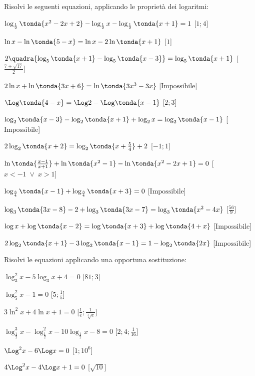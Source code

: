\begin{esercizio}\label{ese:}
 Risolvi le seguenti equazioni, applicando le proprietà dei logaritmi:
 \begin{enumeratea}
   \item \(\log_{\frac{1}{2}} \tonda{x^2-2x+2}-\log_{\frac{1}{2}} x- \log_{\frac{1}{2}} \tonda{x+1}=1\)
   \hfill [\(1;4\)]
   \item \(\ln x-\ln \tonda{5-x}=\ln x-2\ln  \tonda{x+1}\)
   \hfill [\(1\)]
   \item \(2 \quadra{\log_5 \tonda{x+1}-\log_5 \tonda{x-3}}=\log_5 \tonda{x+1}\)
   \hfill [\(\frac{7+\sqrt{17}}{2}\)]
   \item \(2 \ln x+\ln \tonda{3x+6}=\ln \tonda{3x^3-3x}\)
   \hfill [\(\text{Impossibile}\)]
   \item \(\Log \tonda{4-x}=\Log 2 -\Log \tonda{x-1}\)
   \hfill [\(2 ;3\)]
   \item \(\log_2 \tonda{x-3} -\log_2 \tonda{x+1}+\log_2 x = \log_2 \tonda{x-1}\)
   \hfill [\(\text{Impossibile}\)]
   \item \(2 \log_2 \tonda{x+2}=\log_2 \tonda{x+\frac{5}{4}}+2\)
   \hfill [\(-1;1\)]
   \item \(\ln \tonda{\frac{x-1}{x+1}}+\ln \tonda{x^2-1}-\ln \tonda{x^2-2x+1}=0\)
   \hfill [\(x<-1 \;\lor\; x>1\)]
   \item \(\log_{\frac{3}{4}} \tonda{x-1}+\log_{\frac{3}{4}}\tonda{x+3}=0\)
   \hfill [\(\text{Impossibile}\)]
   \item \(\log_3 \tonda{3x-8}-2+\log_3 \tonda{3x-7}=\log_3 \tonda{x^2-4x}\)
   \hfill [\(\frac{56}{9}\)]
   \item  \(\log {x} +\log \tonda{x-2}=\log\tonda{x+3}+\log \tonda{4+x}\)
   \hfill [\(\text{Impossibile}\)]
   \item \(2\log_2 \tonda{x+1}-3\log_2 \tonda{x-1}=1-\log_2 \tonda{2x}\)
   \hfill [\(\text{Impossibile}\)]
 \end{enumeratea}
\end{esercizio}

\begin{esercizio}\label{ese:}
 Risolvi le equazioni applicando una opportuna sostituzione:
 \begin{enumeratea}
  \item  \(\log_3^2 x-5 \log_3 x+4=0\)
   \hfill [\(81;3\)]
  \item  \(\log_5^2 x-1=0\)
   \hfill [\(5;\frac{1}{5}\)]
   \item  \(3\ln^2 x+4 \ln x+1=0\)
   \hfill [\(\frac{1}{e};\frac{1}{\sqrt[3]{e}}\)]
   \item  \(\log_{\frac{1}{2}}^3 x-\log_{\frac{1}{2}}^2 x-10\log_{\frac{1}{2}} x-8=0\)
   \hfill [\(2;4;\frac{1}{16}\)]
   \item  \(\Log^2 x-6\Log x=0\)
   \hfill [\(1;10^6\)]
   \item  \(4 \Log^2 x-4\Log x+1=0\)
   \hfill [\(\sqrt{10}\)]
 \end{enumeratea}
\end{esercizio}

